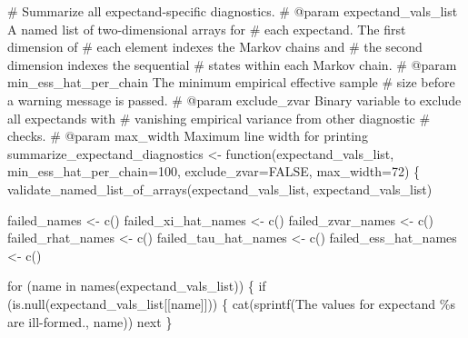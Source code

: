 \documentclass[
  letterpaper,
  DIV=11,
  numbers=noendperiod]{scrartcl}
\newenvironment{Shaded}{\begin{snugshade}}{\end{snugshade}}
\newcommand{\BuiltInTok}[1]{\textcolor[rgb]{0.00,0.23,0.31}{#1}}
\newcommand{\CommentTok}[1]{\textcolor[rgb]{0.37,0.37,0.37}{#1}}
\newcommand{\ControlFlowTok}[1]{\textcolor[rgb]{0.00,0.23,0.31}{#1}}
\newcommand{\DecValTok}[1]{\textcolor[rgb]{0.68,0.00,0.00}{#1}}
\newcommand{\KeywordTok}[1]{\textcolor[rgb]{0.00,0.23,0.31}{#1}}
\newcommand{\NormalTok}[1]{\textcolor[rgb]{0.00,0.23,0.31}{#1}}
\newcommand{\OperatorTok}[1]{\textcolor[rgb]{0.37,0.37,0.37}{#1}}
\newcommand{\SpecialCharTok}[1]{\textcolor[rgb]{0.37,0.37,0.37}{#1}}
\newcommand{\StringTok}[1]{\textcolor[rgb]{0.13,0.47,0.30}{#1}}
\begin{document}
\begin{Shaded}
\begin{Highlighting}[]
\CommentTok{\# Summarize all expectand{-}specific diagnostics.}
\CommentTok{\# @param expectand\_vals\_list A named list of two{-}dimensional arrays for}
\CommentTok{\#                            each expectand.  The first dimension of}
\CommentTok{\#                            each element indexes the Markov chains and}
\CommentTok{\#                            the second dimension indexes the sequential}
\CommentTok{\#                            states within each Markov chain.}
\CommentTok{\# @param min\_ess\_hat\_per\_chain The minimum empirical effective sample}
\CommentTok{\#                              size before a warning message is passed.}
\CommentTok{\# @param exclude\_zvar Binary variable to exclude all expectands with}
\CommentTok{\#                     vanishing empirical variance from other diagnostic}
\CommentTok{\#                     checks.}
\CommentTok{\# @param max\_width Maximum line width for printing}
\NormalTok{summarize\_expectand\_diagnostics }\OperatorTok{\textless{}{-}}\NormalTok{ function(expectand\_vals\_list,}
\NormalTok{                                            min\_ess\_hat\_per\_chain}\OperatorTok{=}\DecValTok{100}\NormalTok{,}
\NormalTok{                                            exclude\_zvar}\OperatorTok{=}\NormalTok{FALSE,}
\NormalTok{                                            max\_width}\OperatorTok{=}\DecValTok{72}\NormalTok{) \{}
\NormalTok{  validate\_named\_list\_of\_arrays(expectand\_vals\_list,}
                                \StringTok{\textquotesingle{}expectand\_vals\_list\textquotesingle{}}\NormalTok{)}

\NormalTok{  failed\_names }\OperatorTok{\textless{}{-}}\NormalTok{ c()}
\NormalTok{  failed\_xi\_hat\_names }\OperatorTok{\textless{}{-}}\NormalTok{ c()}
\NormalTok{  failed\_zvar\_names }\OperatorTok{\textless{}{-}}\NormalTok{ c()}
\NormalTok{  failed\_rhat\_names }\OperatorTok{\textless{}{-}}\NormalTok{ c()}
\NormalTok{  failed\_tau\_hat\_names }\OperatorTok{\textless{}{-}}\NormalTok{ c()}
\NormalTok{  failed\_ess\_hat\_names }\OperatorTok{\textless{}{-}}\NormalTok{ c()}

  \ControlFlowTok{for}\NormalTok{ (name }\KeywordTok{in}\NormalTok{ names(expectand\_vals\_list)) \{}
    \ControlFlowTok{if}\NormalTok{ (}\KeywordTok{is}\NormalTok{.null(expectand\_vals\_list[[name]])) \{}
\NormalTok{      cat(sprintf(}\StringTok{\textquotesingle{}The values for expectand \textasciigrave{}}\SpecialCharTok{\%s}\StringTok{\textasciigrave{} are ill{-}formed.\textquotesingle{}}\NormalTok{,}
\NormalTok{                  name))}
      \BuiltInTok{next}
\NormalTok{    \}}
    

\end{Highlighting}
\end{Shaded}
\end{document}
